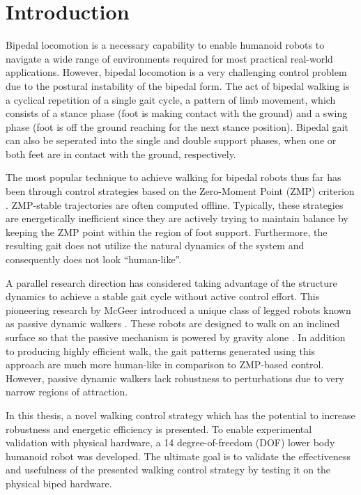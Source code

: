\chapter{Introduction} %
\label{cha:introduction}
Bipedal locomotion is a necessary capability to enable humanoid robots to navigate a wide range of environments required for most practical real-world applications. However, bipedal locomotion is a very challenging control problem due to the postural instability of the bipedal form. The act of bipedal walking is a cyclical repetition of a single gait cycle, a pattern of limb movement, which consists of a stance phase (foot is making contact with the ground) and a swing phase (foot is off the ground reaching for the next stance position). Bipedal gait can also be seperated into the single and double support phases, when one or both feet are in contact with the ground, respectively. 

The most popular technique to achieve walking for bipedal robots thus far has been through control strategies based on the Zero-Moment Point (ZMP) criterion \cite{Vukobratovic:2004wy}. ZMP-stable trajectories are often computed offline. Typically, these strategies \cite{Kajita:1997vr,Sugihara:2002kq} are energetically inefficient since they are actively trying to maintain balance by keeping the ZMP point within the region of foot support. Furthermore, the resulting gait does not utilize the natural dynamics of the system and consequently does not look ``human-like''. 

A parallel research direction has considered taking advantage of the structure dynamics to achieve a stable gait cycle without active control effort. This pioneering research by McGeer \cite{McGeer:1990uk} introduced a unique class of legged robots known as passive dynamic walkers \cite{Collins:2005vp}. These robots are designed to walk on an inclined surface so that the passive mechanism is powered by gravity alone \cite{Spong:1999vk}. In addition to producing highly efficient walk, the gait patterns generated using this approach are much more human-like in comparison to ZMP-based control. However, passive dynamic walkers lack robustness to perturbations due to very narrow regions of attraction. 

In this thesis, a novel walking control strategy which has the potential to increase robustness and energetic efficiency is presented. To enable experimental validation with physical hardware, a 14 degree-of-freedom (DOF) lower body humanoid robot was developed. The ultimate goal is to validate the effectiveness and usefulness of the presented walking control strategy by testing it on the physical biped hardware. 


